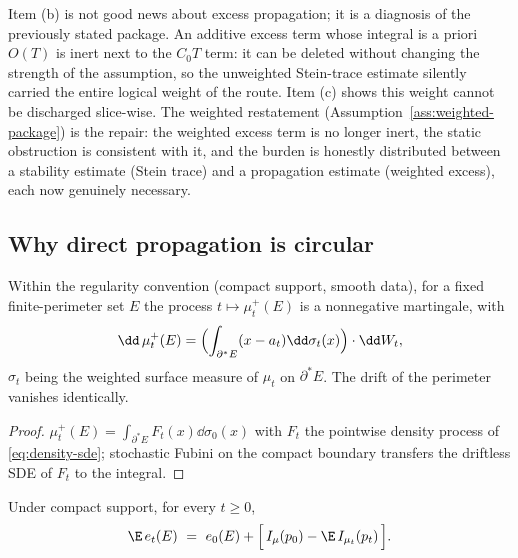 \documentclass[../../main.tex]{subfiles}
\begin{document}
\begin{remark}
\label{rem:audit-interpretation}
Item (b) is not good news about excess propagation; it is a diagnosis of the previously stated
package. An additive excess term whose integral is a priori $O(T)$ is inert next to the $C_0T$
term: it can be deleted without changing the strength of the assumption, so the unweighted
Stein-trace estimate silently carried the entire logical weight of the route. Item (c) shows
this weight cannot be discharged slice-wise. The weighted restatement
(Assumption~\ref{ass:weighted-package}) is the repair: the weighted excess term is no longer
inert, the static obstruction is consistent with it, and the burden is honestly distributed
between a stability estimate (Stein trace) and a propagation estimate (weighted excess), each
now genuinely necessary.
\end{remark}

\subsection{Why direct propagation is circular}
\label{subsec:circularity}

\begin{lemma}
\label{lem:perimeter-martingale}
Within the regularity convention (compact support, smooth data), for a fixed finite-perimeter
set $E$ the process $t\mapsto\mu_t^+(E)$ is a nonnegative martingale, with
\begin{equation}\label{eq:perimeter-sde}
  \dd\,\mu_t^+(E)=\Bigl(\int_{\partial^*E}(x-a_t)\dd\sigma_t(x)\Bigr)\cdot\dd W_t ,
\end{equation}
$\sigma_t$ being the weighted surface measure of $\mu_t$ on $\partial^*E$. The drift of the
perimeter vanishes identically.
\end{lemma}

\begin{proof}
$\mu_t^+(E)=\int_{\partial^*E}F_t(x)\dd\sigma_0(x)$ with $F_t$ the pointwise density process of
\eqref{eq:density-sde}; stochastic Fubini on the compact boundary transfers the driftless SDE
of $F_t$ to the integral.
\end{proof}

\begin{lemma}
\label{lem:excess-identity}
Under compact support, for every $t\ge0$,
\begin{equation}\label{eq:excess-identity}
  \E\,e_t(E)\ =\ e_0(E)+\Bigl[\,I_\mu(p_0)-\E\,I_{\mu_t}(p_t)\,\Bigr].
\end{equation}
\end{lemma}
\end{document}
